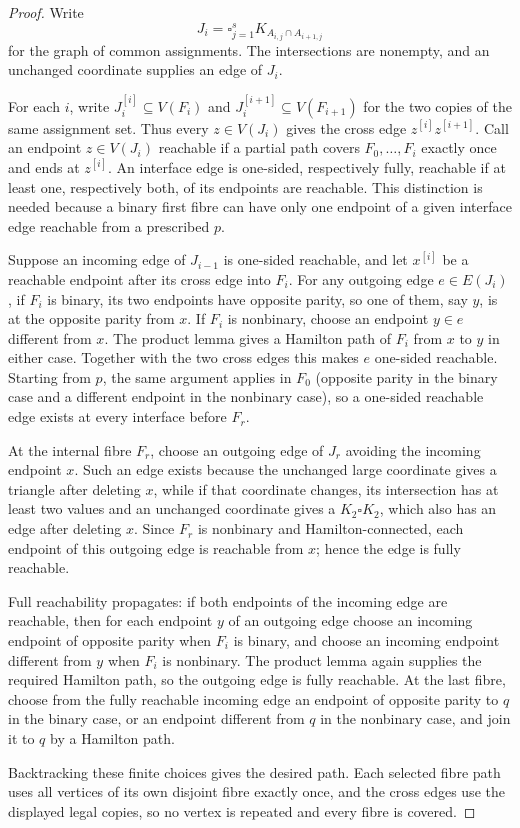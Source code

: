 \documentclass[11pt]{article}
\theoremstyle{remark}
\numberwithin{equation}{section}
\numberwithin{table}{section}
\begin{document}
\begin{proof}
Write
\[
 J_i=\square_{j=1}^s K_{A_{i,j}\cap A_{i+1,j}}
\]
for the graph of common assignments.  The intersections are nonempty,
and an unchanged coordinate supplies an edge of $J_i$.

For each $i$, write $J_i^{[i]}\subseteq V(F_i)$ and
$J_i^{[i+1]}\subseteq V(F_{i+1})$ for the two copies of the same
assignment set.  Thus every $z\in V(J_i)$ gives the cross edge
$z^{[i]}z^{[i+1]}$.  Call an endpoint $z\in V(J_i)$ reachable if a
partial path covers $F_0,\ldots,F_i$ exactly once and ends at
$z^{[i]}$.  An interface edge is one-sided, respectively fully,
reachable if at least one, respectively both, of its endpoints are
reachable.  This distinction is needed because a binary first fibre
can have only one endpoint of a given interface edge reachable from a
prescribed $p$.

Suppose an incoming edge of $J_{i-1}$ is one-sided reachable, and let
$x^{[i]}$ be a reachable endpoint after its cross edge into $F_i$.
For any outgoing edge $e\in E(J_i)$, if $F_i$ is binary, its two
endpoints have opposite parity, so one of them, say $y$, is at the
opposite parity from $x$.  If $F_i$ is nonbinary, choose an endpoint
$y\in e$ different from $x$.  The product lemma gives a Hamilton path
of $F_i$ from $x$ to $y$ in either case.  Together with the two cross
edges this makes $e$ one-sided reachable.  Starting from $p$, the same
argument applies in $F_0$ (opposite parity in the binary case and a
different endpoint in the nonbinary case), so a one-sided reachable
edge exists at every interface before $F_r$.

At the internal fibre $F_r$, choose an outgoing edge of $J_r$ avoiding
the incoming endpoint $x$.  Such an edge exists because the unchanged
large coordinate gives a triangle after deleting $x$, while if that
coordinate changes, its intersection has at least two values and an
unchanged coordinate gives a $K_2\square K_2$, which also has an edge
after deleting $x$.  Since $F_r$ is nonbinary and Hamilton-connected,
each endpoint of this outgoing edge is reachable from $x$; hence the
edge is fully reachable.

Full reachability propagates: if both endpoints of the incoming edge
are reachable, then for each endpoint $y$ of an outgoing edge choose an
incoming endpoint of opposite parity when $F_i$ is binary, and choose
an incoming endpoint different from $y$ when $F_i$ is nonbinary.  The
product lemma again supplies the required Hamilton path, so the outgoing
edge is fully reachable.  At the last fibre, choose from the fully
reachable incoming edge an endpoint of opposite parity to $q$ in the
binary case, or an endpoint different from $q$ in the nonbinary case,
and join it to $q$ by a Hamilton path.

Backtracking these finite choices gives the desired path.  Each selected
fibre path uses all vertices of its own disjoint fibre exactly once, and
the cross edges use the displayed legal copies, so no vertex is repeated
and every fibre is covered.
\end{proof}
\end{document}
